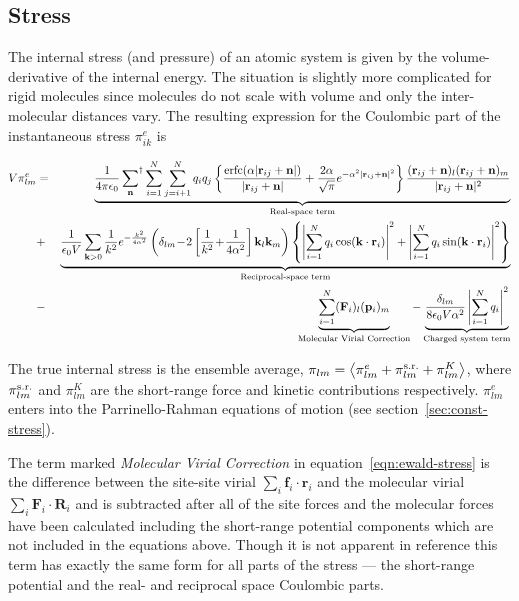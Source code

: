 \documentclass[a4paper,twoside]{report}
\providecommand{\bm}[1]{\mathbf{#1}}
\newcommand{\erfc}{\mbox{erfc}}
\begin{document}
\subsection{Stress}

The internal stress (and pressure) of an atomic system is given by the
volume-derivative of the internal energy.  The situation is slightly
more complicated for rigid molecules since molecules do not scale with
volume and only the inter-molecular distances vary.  The resulting
expression for the Coulombic part of the instantaneous stress
$\pi_{ik}^e$ is\cite[Appendix A]{nose:83}

\begin{eqnarray}
\label{eqn:ewald-stress}
V\pi_{lm}^e & = & \underbrace{\frac{1}{4 \pi \epsilon_0}
\sideset{}{^\dag}\sum_{\bm{n}}\sum_{i=1}^{N} \sum_{j=i+1}^{N} q_iq_j 
\left \lbrace 
\frac{\erfc( \alpha | \bm{r}_{ij} +  \bm{n} |)}{| \bm{r}_{ij} +\bm{n} | } +
\frac{2 \alpha}{\sqrt{\pi}}e^{- \alpha^2 | \bm{r}_{ij} +  \bm{n} |^2}
\right \rbrace \frac{(\bm{r}_{ij} + \bm{n})_l(\bm{r}_{ij} +
\bm{n})_m}{| \bm{r}_{ij} + \bm{n} |^2}}_{\textnormal{Real-space term}}
    \nonumber \\
 & + & \underbrace{\frac{1}{\epsilon_0 V} \sum_{\bm{k} > 0} \frac{1}{k^2}
       e^{-\frac{k^2}{4 \alpha^2}}
\left ( \delta_{lm}  \!- \! 2 \left [ \frac{1}{k^2} \! + \! \frac{1}{4 \alpha^2}
\right ] \bm{k}_l\bm{k}_m \right )\left \lbrace 
%
\left | \sum_{i=1}^{N} q_i \cos(\bm{k \cdot r}_i) \right |^2 + 
\left | \sum_{i=1}^{N} q_i \sin(\bm{k \cdot r}_i) \right |^2 
\right \rbrace}_{\textnormal{Reciprocal-space term}} \nonumber \\
& - & \underbrace{\sum_{i=1}^{N}  (\bm{F}_i)_l
  (\bm{p}_i)_m}_{\textnormal{Molecular Virial Correction}} 
-  \underbrace{ \frac{\delta_{lm}}{8 \epsilon_0 V \alpha^2}
                    \left | \sum_{i=1}^N q_i 
                    \right |^2}_{\textnormal{Charged system term}}
\end{eqnarray}

The true internal stress is the ensemble average, $\pi_{lm} = \left <
  \pi_{lm}^e + \pi_{lm}^{\textnormal{s.r.}} + \pi_{lm}^K \right >$,
where $\pi_{lm}^{\textnormal{s.r.}}$ and $\pi_{lm}^K$ are the
short-range force and kinetic contributions respectively.
$\pi_{lm}^e$ enters into the Parrinello-Rahman equations of motion
(see section~\ref{sec:const-stress}).

The term marked \emph{Molecular Virial Correction} in
equation~\ref{eqn:ewald-stress} is the difference between the
site-site virial $\sum_i \bm{f}_i \cdot \bm{r}_i$ and the molecular virial
$\sum_i \bm{F}_i \cdot \bm{R}_i$ and is subtracted after all of the site forces
and the molecular forces have been calculated including the
short-range potential components which are not included in the
equations above.  Though it is not apparent in reference\cite[Appendix
A]{nose:83} this term has exactly the same form for all parts of the
stress --- the short-range potential and the real- and reciprocal
space Coulombic parts.
\end{document}
